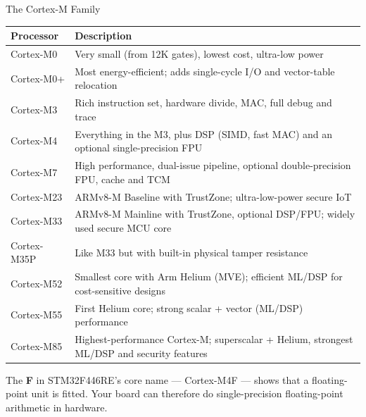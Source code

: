 \documentclass[9pt,aspectratio=169,xcolor=table]{beamer}
\newcommand{\striped}{\rowcolors{1}{white}{stripe}}
\begin{document}
\begin{frame}{The Cortex-M Family}
	\begin{center}
		{\small
			\striped
			\begin{tabular}{lp{}}
				\toprule
				\textbf{Processor} & \textbf{Description} \\
				\midrule
				Cortex-M0  & Very small (from 12K gates), lowest cost, ultra-low power \\
				Cortex-M0+ & Most energy-efficient; adds single-cycle I/O and vector-table relocation \\
				Cortex-M3  & Rich instruction set, hardware divide, MAC, full debug and trace \\
				\alert{Cortex-M4} & {Everything in the M3, plus DSP (SIMD, fast MAC) and an optional
					single-precision FPU} \\
				Cortex-M7  & High performance, dual-issue pipeline, optional double-precision FPU, cache and TCM \\
				Cortex-M23 & ARMv8-M Baseline with TrustZone; ultra-low-power secure IoT \\
				Cortex-M33 & ARMv8-M Mainline with TrustZone, optional DSP/FPU; widely used secure MCU core \\
				Cortex-M35P & Like M33 but with built-in physical tamper resistance \\
				Cortex-M52 & Smallest core with Arm Helium (MVE); efficient ML/DSP for cost-sensitive designs \\
				Cortex-M55 & First Helium core; strong scalar + vector (ML/DSP) performance \\
				Cortex-M85 & Highest-performance Cortex-M; superscalar + Helium, strongest ML/DSP and security features \\
				\bottomrule
		\end{tabular}}
	\end{center}
	\vspace{2mm}
	{\small The \textbf{F} in STM32F446RE's core name --- Cortex-M4\alert{F} --- shows that a floating-point unit is fitted. Your board can therefore do single-precision floating-point arithmetic in hardware.}
\end{frame}
\end{document}
